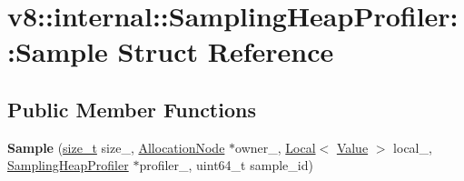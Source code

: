 \hypertarget{structv8_1_1internal_1_1SamplingHeapProfiler_1_1Sample}{}\section{v8\+:\+:internal\+:\+:Sampling\+Heap\+Profiler\+:\+:Sample Struct Reference}
\label{structv8_1_1internal_1_1SamplingHeapProfiler_1_1Sample}
\subsection*{Public Member Functions}
\begin{DoxyCompactItemize}
\item 
\mbox{\label{structv8_1_1internal_1_1SamplingHeapProfiler_1_1Sample_a56850b0a4207a85ac878c71782c68bbb}} 
{\bfseries Sample} (\mbox{\hyperlink{classsize__t}{size\+\_\+t}} size\+\_\+, \mbox{\hyperlink{classv8_1_1internal_1_1SamplingHeapProfiler_1_1AllocationNode}{Allocation\+Node}} $\ast$owner\+\_\+, \mbox{\hyperlink{classv8_1_1Local}{Local}}$<$ \mbox{\hyperlink{classv8_1_1Value}{Value}} $>$ local\+\_\+, \mbox{\hyperlink{classv8_1_1internal_1_1SamplingHeapProfiler}{Sampling\+Heap\+Profiler}} $\ast$profiler\+\_\+, uint64\+\_\+t sample\+\_\+id)
\end{DoxyCompactItemize}

